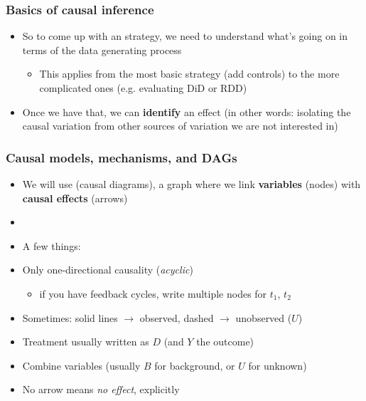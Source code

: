 \note{}
\begin{frame}
\frametitle{Basics of causal inference}
\centering

\begin{itemize}[<+->]
  \item So to come up with an strategy, we need to understand what's going on in terms of the data generating process
  \begin{itemize}
    \item This applies from the most basic strategy (add controls) to the more complicated ones (e.g. evaluating DiD or RDD)
  \end{itemize}
  \item Once we have that, we can \textbf{identify} an effect (in other words: isolating the causal variation from other sources of variation we are not interested in)
\end{itemize}

\end{frame}
\note{}

\begin{frame}
\frametitle{Causal models, mechanisms, and DAGs}
\centering

\begin{itemize}
  \item We will use  (causal diagrams), a graph where we link \textbf{variables} (nodes) with \textbf{causal effects} (arrows)
  \item[]
  \item[]<2-> A few things:
  \item<3-> Only one-directional causality (\textit{acyclic})
  \begin{itemize}
    \item if you have feedback cycles, write multiple nodes for $t_{1}$, $t_{2}$
  \end{itemize}
  \item<4-> Sometimes: solid lines $\rightarrow$ observed, dashed $\rightarrow$ unobserved ($U$)
  \item<5-> Treatment usually written as $D$ (and $Y$ the outcome)
  \item<6-> Combine variables (usually $B$ for background, or $U$ for unknown)
  \item<7-> No arrow means \textit{no effect}, explicitly
\end{itemize}

\end{frame}
\note{}

